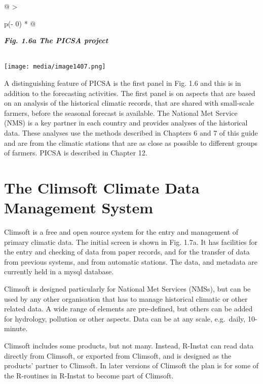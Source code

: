 \documentclass[
  letterpaper,
  DIV=11,
  numbers=noendperiod]{scrreprt}
\begin{document}
\begin{longtable}[]{@{}
  >{\raggedright\arraybackslash}p{(\columnwidth - 0\tabcolsep) * }@{}}
\toprule\noalign{}
\begin{minipage}[b]{\linewidth}\raggedright
\textbf{\emph{Fig. 1.6a The PICSA project}}
\end{minipage} \\
\midrule\noalign{}
\endhead
\bottomrule\noalign{}
\endlastfoot
\texttt{[image: media/image1407.png]} \\
\end{longtable}

A distinguishing feature of PICSA is the first panel in Fig. 1.6 and
this is in addition to the forecasting activities. The first panel is on
aspects that are based on an analysis of the historical climatic
records, that are shared with small-scale farmers, before the seasonal
forecast is available. The National Met Service (NMS) is a key partner
in each country and provides analyses of the historical data. These
analyses use the methods described in Chapters 6 and 7 of this guide and
are from the climatic stations that are as close as possible to
different groups of farmers. PICSA is described in Chapter 12.

\section{The Climsoft Climate Data Management
System}\label{the-climsoft-climate-data-management-system}

Climsoft is a free and open source system for the entry and management
of primary climatic data. The initial screen is shown in Fig. 1.7a. It
has facilities for the entry and checking of data from paper records,
and for the transfer of data from previous systems, and from automatic
stations. The data, and metadata are currently held in a mysql database.

Climsoft is designed particularly for National Met Services (NMSs), but
can be used by any other organisation that has to manage historical
climatic or other related data. A wide range of elements are
pre-defined, but others can be added for hydrology, pollution or other
aspects. Data can be at any scale, e.g.~daily, 10-minute.

Climsoft includes some products, but not many. Instead, R-Instat can
read data directly from Climsoft, or exported from Climsoft, and is
designed as the products' partner to Climsoft. In later versions of
Climsoft the plan is for some of the R-routines in R-Instat to become
part of Climsoft.
\end{document}
